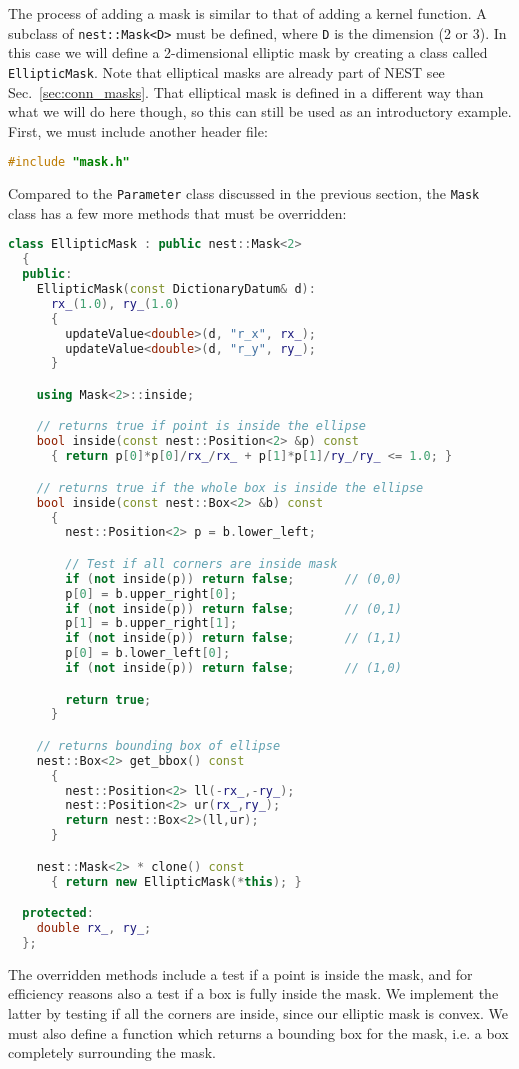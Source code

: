 \documentclass[a4paper,12pt]{report}
\begin{document}
The process of adding a mask is similar to that of adding a kernel
function. A subclass of \lstinline!nest::Mask<D>! must be defined, where
\lstinline!D! is the dimension (2 or 3). In this case we will define a
2-dimensional elliptic mask by creating a class called
\lstinline!EllipticMask!. Note that elliptical masks are already part of NEST
see Sec.~\ref{sec:conn_masks}. That elliptical mask is defined in a different
way than what we will do here though, so this can still be used as an
introductory example. First, we must include another header file:
\begin{lstlisting}[language=C++]
#include "mask.h"
\end{lstlisting}
Compared to the \lstinline!Parameter! class discussed in the previous
section, the \lstinline!Mask! class has a few more methods that must be
overridden:
\begin{lstlisting}[language=C++]
  class EllipticMask : public nest::Mask<2>
  {
  public:
    EllipticMask(const DictionaryDatum& d):
      rx_(1.0), ry_(1.0)
      {
        updateValue<double>(d, "r_x", rx_);
        updateValue<double>(d, "r_y", ry_);
      }

    using Mask<2>::inside;

    // returns true if point is inside the ellipse
    bool inside(const nest::Position<2> &p) const
      { return p[0]*p[0]/rx_/rx_ + p[1]*p[1]/ry_/ry_ <= 1.0; }

    // returns true if the whole box is inside the ellipse
    bool inside(const nest::Box<2> &b) const
      {
        nest::Position<2> p = b.lower_left;

        // Test if all corners are inside mask
        if (not inside(p)) return false;       // (0,0)
        p[0] = b.upper_right[0];
        if (not inside(p)) return false;       // (0,1)
        p[1] = b.upper_right[1];
        if (not inside(p)) return false;       // (1,1)
        p[0] = b.lower_left[0];
        if (not inside(p)) return false;       // (1,0)

        return true;
      }

    // returns bounding box of ellipse
    nest::Box<2> get_bbox() const
      {
        nest::Position<2> ll(-rx_,-ry_);
        nest::Position<2> ur(rx_,ry_);
        return nest::Box<2>(ll,ur);
      }

    nest::Mask<2> * clone() const
      { return new EllipticMask(*this); }

  protected:
    double rx_, ry_;
  };
\end{lstlisting}
The overridden methods include a test if a point is inside the mask, and
for efficiency reasons also a test if a box is fully inside the mask. We
implement the latter by testing if all the corners are inside, since our
elliptic mask is convex. We must also define a function which returns a
bounding box for the mask, i.e. a box completely surrounding the mask.
\end{document}
